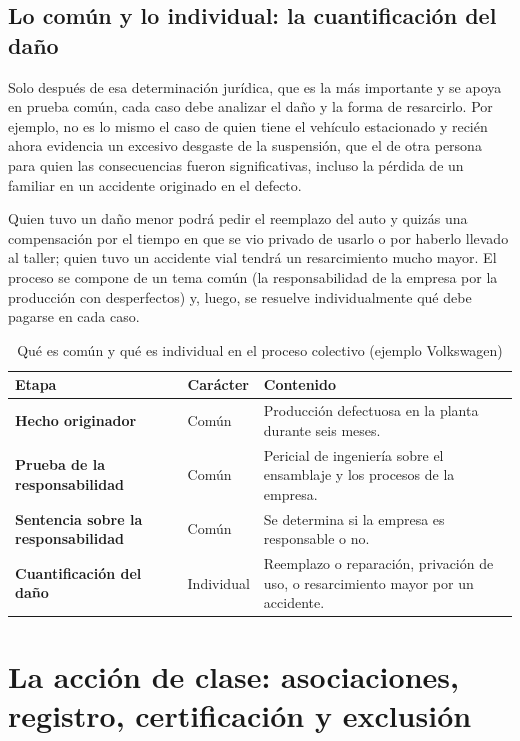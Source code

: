 \documentclass[12pt,oneside]{book}
\begin{document}
\subsection{Lo común y lo individual: la cuantificación del daño}

Solo después de esa determinación jurídica, que es la más importante y se apoya en prueba común, cada caso debe analizar el daño y la forma de resarcirlo. Por ejemplo, no es lo mismo el caso de quien tiene el vehículo estacionado y recién ahora evidencia un excesivo desgaste de la suspensión, que el de otra persona para quien las consecuencias fueron significativas, incluso la pérdida de un familiar en un accidente originado en el defecto.

Quien tuvo un daño menor podrá pedir el reemplazo del auto y quizás una compensación por el tiempo en que se vio privado de usarlo o por haberlo llevado al taller; quien tuvo un accidente vial tendrá un resarcimiento mucho mayor. El proceso se compone de un tema común (la responsabilidad de la empresa por la producción con desperfectos) y, luego, se resuelve individualmente qué debe pagarse en cada caso.

\begin{table}[H]
\centering
\caption{Qué es común y qué es individual en el proceso colectivo (ejemplo Volkswagen)}
\renewcommand{\arraystretch}{1.25}
\begin{tabularx}{\textwidth}{>{\raggedright\arraybackslash}p{} >{\raggedright\arraybackslash}p{} >{\raggedright\arraybackslash}X}
\toprule
\textbf{Etapa} & \textbf{Carácter} & \textbf{Contenido} \\
\midrule
\textbf{Hecho originador} & Común & Producción defectuosa en la planta durante seis meses. \\
\textbf{Prueba de la responsabilidad} & Común & Pericial de ingeniería sobre el ensamblaje y los procesos de la empresa. \\
\textbf{Sentencia sobre la responsabilidad} & Común & Se determina si la empresa es responsable o no. \\
\textbf{Cuantificación del daño} & Individual & Reemplazo o reparación, privación de uso, o resarcimiento mayor por un accidente. \\
\bottomrule
\end{tabularx}
\end{table}

\section{La acción de clase: asociaciones, registro, certificación y exclusión}
\end{document}
